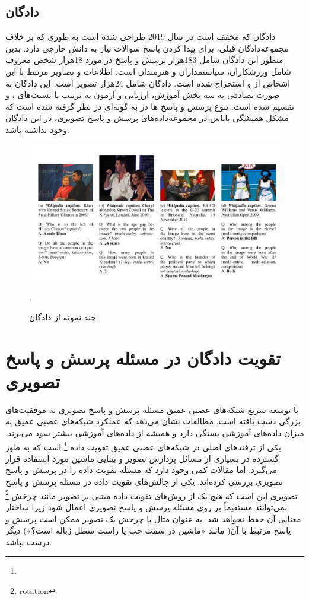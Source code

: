 \subsection{ دادگان }
	 دادگان 
	\cite{shah2019kvqa}
	 که مخفف
	است در سال 2019 طراحی شده است به طوری که بر خلاف مجموعه‌دادگان قبلی، برای پیدا کردن پاسخ سوالات نیاز به دانش خارجی دارد. بدین منظور این دادگان شامل 183هزار پرسش و پاسخ در مورد 18هزار شخص معروف شامل ورزشکاران، سیاستمداران و هنرمندان است.  اطلاعات و تصاویر مرتبط با این  اشخاص از
	و
	استخراج شده است. دادگان
شامل 24هزار تصویر است. این ‌دادگان به صورت تصادفی به سه بخش آموزش، ارزیابی و آزمون به ترتیب با نسبت‌های
 	، 
  و
   تقسیم شده است. تنوع پرسش و پاسخ ها در 
	به گونه‌ای در نظر گرفته شده است که مشکل همیشگی بایاس در مجموعه‌داده‌های پرسش و پاسخ تصویری، در این دادگان وجود نداشته باشد.
   \begin{figure}
		\centerline{\includegraphics[scale=0.4]{images/KVQA.JPG}}
		\caption[چند نمونه از ‌دادگان]{چند نمونه از ‌دادگان \cite{shah2019kvqa}}.
		\label{fig:KVQAExample}
    \end{figure}

\section{تقویت ‌دادگان در مسئله پرسش و پاسخ تصویری}
با توسعه سریع شبکه‌های عصبی عمیق مسئله پرسش و پاسخ تصویری به موفقیت‌های بزرگی دست یافته است. مطالعات نشان می‌دهد که عملکرد شبکه‌های عصبی عمیق به میزان داده‌های آموزشی بستگی دارد و همیشه از داده‌های آموزشی بیشتر سود می‌برند. یکی از ترفندهای اصلی در شبکه‌های عصبی عمیق تقویت داده
\footnote{}
 است که به طور گسترده در بسیاری از مسائل پردازش تصویر و بینایی ماشین مورد استفاده قرار می‌گیرد. اما مقالات کمی وجود دارد که مسئله تقویت داده را در پرسش و پاسخ تصویری بررسی کرده‌اند. یکی از چالش‌های تقویت داده در مسئله پرسش و پاسخ تصویری این است که هیچ یک از روش‌های تقویت داده مبتنی بر تصویر مانند چرخش
 \footnote{rotation}
  نمی‌توانند مستقیماً بر روی مسئله پرسش و پاسخ تصویری اعمال شود زیرا ساختار معنایی آن حفظ نخواهد شد. به عنوان مثال با چرخش یک تصویر ممکن است پرسش و پاسخ مرتبط با آن( مانند «ماشین در سمت چپ یا راست سطل زباله است؟») دیگر درست نباشد.
  
